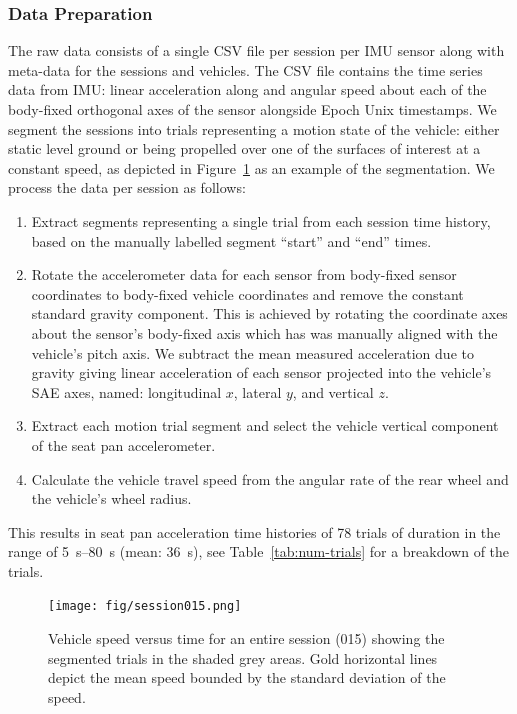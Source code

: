 \documentclass[a4paper]{article}
\begin{document}
\subsubsection{Data Preparation}
%
The raw data consists of a single CSV file per session per IMU sensor along with
meta-data for the sessions and vehicles. The CSV file contains the time series
data from IMU: linear acceleration along and angular speed about each of the
body-fixed orthogonal axes of the sensor alongside Epoch Unix timestamps. We
segment the sessions into trials representing a motion state of the vehicle:
either static level ground or being propelled over one of the surfaces of
interest at a constant speed, as depicted in Figure~\ref{fig:session} as an
example of the segmentation. We process the data per session as follows:
%
\begin{enumerate}
  \item Extract segments representing a single trial from each session time
    history, based on the manually labelled segment ``start'' and ``end'' times.
  \item Rotate the accelerometer data for each sensor from body-fixed sensor
    coordinates to body-fixed vehicle coordinates and remove the constant
    standard gravity component. This is achieved by rotating the coordinate axes
    about the sensor's body-fixed axis which has was manually aligned with the
    vehicle's pitch axis. We subtract the mean measured acceleration due to
    gravity giving linear acceleration of each sensor projected into the
    vehicle's SAE axes, named: longitudinal $x$, lateral $y$, and vertical $z$.
  \item Extract each motion trial segment and select the vehicle vertical
    component of the seat pan accelerometer.
  \item Calculate the vehicle travel speed from the angular rate of the rear
    wheel and the vehicle's wheel radius.
\end{enumerate}
%
This results in seat pan acceleration time histories of 78 trials of duration
in the range of \SIrange{5}{80}{\second} (mean: 36~\si{\second}), see
Table~\ref{tab:num-trials} for a breakdown of the trials.
%
\begin{figure}
  \centering
  \texttt{[image: fig/session015.png]}
  \caption{Vehicle speed versus time for an entire session (015) showing the
  segmented trials in the shaded grey areas. Gold horizontal lines depict the
  mean speed bounded by the standard deviation of the speed.}
  \label{fig:session}
\end{figure}
\end{document}
